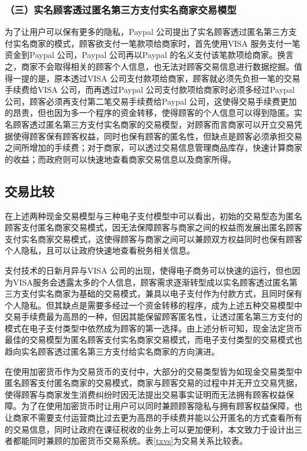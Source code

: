 		\subsubsection{（三）实名顾客透过匿名第三方支付实名商家交易模型}
		为了让用户可以保有更多的隐私，Paypal 公司提出了实名顾客透过匿名第三⽅⽀付实名商家的模式，顾客欲⽀付⼀笔款项给商家时，⾸先使⽤VISA 服务⽀付⼀笔资⾦到Paypal 公司，Paypal 公司再以Paypal 的名义⽀付该笔款项给商家。换⾔之，商家不会取得相关的顾客个⼈信息，也无法对顾客交易信息进⾏数据挖掘。值得⼀提的是，原本透过VISA 公司⽀付款项给商家，顾客就必须先负担一笔的交易⼿续费给VISA 公司，而再透过Paypal 公司⽀付款项给商家时必须多经过Paypal 公司，顾客必须再⽀付第二笔交易⼿续费给Paypal 公司，这使得交易⼿续费更加的昂贵，但也因为多⼀个程序的资⾦转移，使得顾客的个⼈信息可以得到隐匿。实名顾客透过匿名第三⽅⽀付实名商家的交易模型，对顾客⽽⾔商家可以开⽴交易凭据使得顾客保有顾客权益，同时也保有顾客的匿名性，但缺点是顾客必须承担交易之间所增加的⼿续费；对于商家，可以透过交易信息管理商品库存，快速计算商家的收益；而政府则可以快速地查看商家交易信息以及商家所得。

		\subsection{交易比较}


		在上述两种现金交易模型与三种电子支付模型中可以看出，初始的交易型态为匿名顾客⽀付匿名商家交易模式，因无法保障顾客与商家之间的权益而发展出匿名顾客⽀付实名商家交易模式，这使得顾客与商家之间可以兼顾双⽅权益同时也保有顾客个⼈隐私，且可以让政府快速地查看税务相关信息。

		⽀付技术的⽇新⽉异与VISA 公司的出现，使得电⼦商务可以快速的运⾏，但也因为VISA服务会透露太多的个⼈信息，顾客需求逐渐转型成以实名顾客透过匿名第三⽅⽀付实名商家为基础的交易模式，兼具以电⼦⽀付作为付款⽅式，且同时保有个⼈隐私。但其缺点是需要多经过⼀个资金转移的程序，成为上述五种交易模型中交易手续费最为高昂的一种，但因其能保留顾客匿名性，让透过匿名第三⽅⽀付的模式在电子支付类型中依然成为顾客的第一选择。由上述分析可知，现⾦法定货币最佳的交易模型为匿名顾客⽀付实名商家交易模式，⽽电⼦⽀付类型的交易模式也趋向实名顾客透过匿名第三方支付给实名商家的方向演进。

		在使用加密货币作为交易货币的⽀付中，⼤部分的交易类型皆为如现⾦交易类型中匿名顾客⽀付匿名商家的交易模式，商家与顾客交易的过程中并无开⽴交易凭据，使得顾客与商家发⽣消费纠纷时因无法提出交易事实证明而无法拥有顾客权益保障。为了在使用加密货币时让用户可以同时兼顾顾客隐私与拥有顾客权益保障，也让商家不需要⽀付运营商比过去更为高昂的⼿续费并能以公开匿名的⽅式查看所有的交易信息，同时让政府在课征税收的业务上可以更加便利，本⽂致⼒于设计出三者都能同时兼顾的加密货币交易系统。表\ref{txvs}为交易关系⽐较表。


